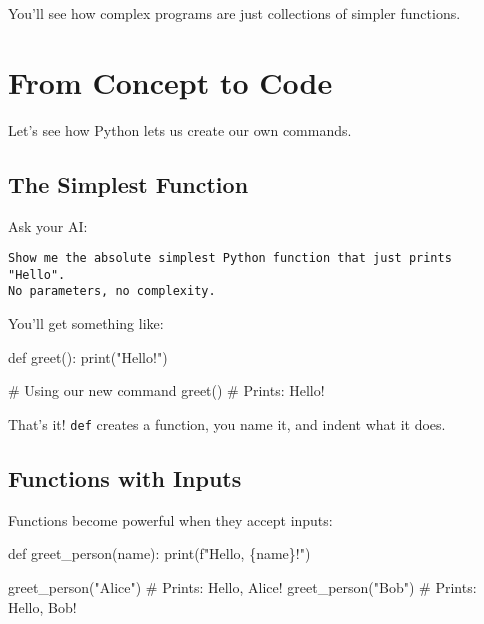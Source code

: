 \documentclass[
  letterpaper,
  DIV=11,
  numbers=noendperiod,
  oneside]{scrreprt}
\newenvironment{Shaded}{}{}
\newcommand{\BuiltInTok}[1]{\textcolor[rgb]{0.84,0.23,0.29}{#1}}
\newcommand{\CommentTok}[1]{\textcolor[rgb]{0.42,0.45,0.49}{#1}}
\newcommand{\KeywordTok}[1]{\textcolor[rgb]{0.84,0.23,0.29}{#1}}
\newcommand{\NormalTok}[1]{\textcolor[rgb]{0.14,0.16,0.18}{#1}}
\newcommand{\SpecialCharTok}[1]{\textcolor[rgb]{0.00,0.36,0.77}{#1}}
\newcommand{\SpecialStringTok}[1]{\textcolor[rgb]{0.01,0.18,0.38}{#1}}
\newcommand{\StringTok}[1]{\textcolor[rgb]{0.01,0.18,0.38}{#1}}
\begin{document}
You'll see how complex programs are just collections of simpler
functions.

\section{From Concept to Code}\label{from-concept-to-code-5}

Let's see how Python lets us create our own commands.

\subsection{The Simplest Function}\label{the-simplest-function}

Ask your AI:

\begin{verbatim}
Show me the absolute simplest Python function that just prints "Hello". 
No parameters, no complexity.
\end{verbatim}

You'll get something like:

\begin{Shaded}
\begin{Highlighting}[]
\KeywordTok{def}\NormalTok{ greet():}
    \BuiltInTok{print}\NormalTok{(}\StringTok{"Hello!"}\NormalTok{)}

\CommentTok{\# Using our new command}
\NormalTok{greet()  }\CommentTok{\# Prints: Hello!}
\end{Highlighting}
\end{Shaded}

That's it! \texttt{def} creates a function, you name it, and indent what
it does.

\subsection{Functions with Inputs}\label{functions-with-inputs}

Functions become powerful when they accept inputs:

\begin{Shaded}
\begin{Highlighting}[]
\KeywordTok{def}\NormalTok{ greet\_person(name):}
    \BuiltInTok{print}\NormalTok{(}\SpecialStringTok{f"Hello, }\SpecialCharTok{\{}\NormalTok{name}\SpecialCharTok{\}}\SpecialStringTok{!"}\NormalTok{)}

\NormalTok{greet\_person(}\StringTok{"Alice"}\NormalTok{)  }\CommentTok{\# Prints: Hello, Alice!}
\NormalTok{greet\_person(}\StringTok{"Bob"}\NormalTok{)    }\CommentTok{\# Prints: Hello, Bob!}
\end{Highlighting}
\end{Shaded}
\end{document}

